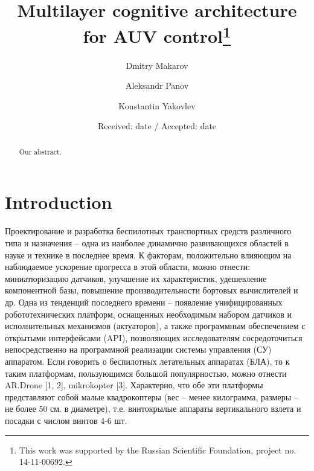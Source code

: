 \documentclass{svjour3}                     %
\begin{document}
\title{Multilayer cognitive architecture for AUV control\thanks{This work was supported by the Russian Scientific Foundation, project no. 14-11-00692.}
}

\author{Dmitry Makarov         \and
        Aleksandr Panov \and
        Konstantin Yakovlev
}


\date{Received: date / Accepted: date}

\maketitle

\begin{abstract}
Our abstract.
\end{abstract}

\section{Introduction}
\label{intro}
Проектирование и разработка беспилотных транспортных средств различного типа и назначения – одна из наиболее динамично развивающихся областей в науке и технике в последнее время. К факторам, положительно влияющим на наблюдаемое ускорение прогресса в этой области, можно отнести: миниатюризацию датчиков, улучшение их характеристик, удешевление компонентной базы, повышение производительности бортовых вычислителей и др. Одна из тенденций последнего времени – появление унифицированных робототехнических платформ, оснащенных необходимым набором датчиков и исполнительных механизмов (актуаторов), а также программным обеспечением с открытыми интерфейсами (API), позволяющих исследователям сосредоточиться непосредственно на программной реализации системы управления (СУ) аппаратом. Если говорить о беспилотных летательных аппаратах (БЛА), то к таким платформам, пользующимся большой популярностью, можно отнести AR.Drone [1, 2], mikrokopter [3]. Характерно, что обе эти платформы представляют собой малые квадрокоптеры (вес – менее килограмма, размеры – не более 50 см. в диаметре), т.е. винтокрылые аппараты вертикального взлета и посадки с числом винтов 4-6 шт.
\end{document}
